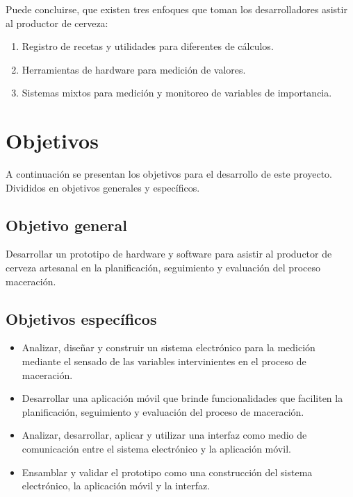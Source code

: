     Puede concluirse, que existen tres enfoques que toman los desarrolladores asistir al productor de cerveza: 
   
    \begin{enumerate}
            \item Registro de recetas y utilidades para diferentes de cálculos.
            \item Herramientas de hardware para medición de valores.
            \item Sistemas mixtos para medición y monitoreo de variables de importancia.
    \end{enumerate}

\section{Objetivos}
\label{secccionObjetivos}
    \par
    A continuación se presentan los objetivos para el desarrollo de este proyecto. Divididos en objetivos generales y específicos.

    \subsection{Objetivo general}
        \par
        Desarrollar un prototipo de hardware y software para asistir al productor de cerveza artesanal en la planificación, seguimiento y evaluación del proceso maceración. 
    \subsection{Objetivos específicos}
        \begin{itemize}
            \item Analizar, diseñar y construir un sistema electrónico para la medición mediante el sensado de las variables intervinientes en el proceso de maceración.
            
            \item Desarrollar una aplicación móvil que brinde funcionalidades que faciliten la planificación, seguimiento y evaluación del proceso de maceración.
            
            \item Analizar, desarrollar, aplicar y utilizar una interfaz como medio de comunicación entre el sistema electrónico y la aplicación móvil.
            
            \item Ensamblar y validar el prototipo como una construcción del sistema electrónico, la aplicación móvil y la interfaz.
        \end{itemize}
 
